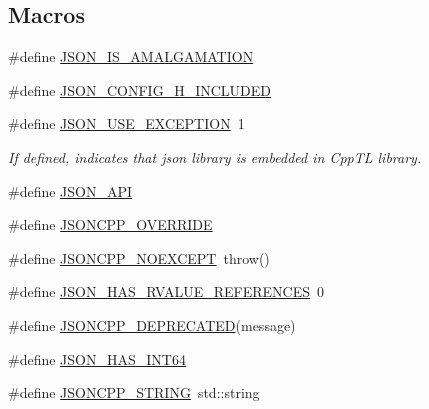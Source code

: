 \subsection*{Macros}
\begin{DoxyCompactItemize}
\item 
\#define \hyperlink{json-forwards_8h_a1bf16856b5e907aa83ed7bc825bc5ecf_a1bf16856b5e907aa83ed7bc825bc5ecf}{J\+S\+O\+N\+\_\+\+I\+S\+\_\+\+A\+M\+A\+L\+G\+A\+M\+A\+T\+I\+ON}
\item 
\#define \hyperlink{json-forwards_8h_a71f1a94bee4773f2a6e30eeac7deb963_a71f1a94bee4773f2a6e30eeac7deb963}{J\+S\+O\+N\+\_\+\+C\+O\+N\+F\+I\+G\+\_\+\+H\+\_\+\+I\+N\+C\+L\+U\+D\+ED}
\item 
\#define \hyperlink{json-forwards_8h_a51968e67b1462ac893f87a0fc8b791cd_a51968e67b1462ac893f87a0fc8b791cd}{J\+S\+O\+N\+\_\+\+U\+S\+E\+\_\+\+E\+X\+C\+E\+P\+T\+I\+ON}~1
\begin{DoxyCompactList}\small\item\em If defined, indicates that json library is embedded in Cpp\+TL library. \end{DoxyCompactList}\item 
\#define \hyperlink{json-forwards_8h_a1d61ffde86ce1a18fd83194ff0d9a206_a1d61ffde86ce1a18fd83194ff0d9a206}{J\+S\+O\+N\+\_\+\+A\+PI}
\item 
\#define \hyperlink{json-forwards_8h_a824d6199c91488107e443226fa6022c5_a824d6199c91488107e443226fa6022c5}{J\+S\+O\+N\+C\+P\+P\+\_\+\+O\+V\+E\+R\+R\+I\+DE}
\item 
\#define \hyperlink{json-forwards_8h_af8418c6d82d9de6e5f3c739fcf2fe88d_af8418c6d82d9de6e5f3c739fcf2fe88d}{J\+S\+O\+N\+C\+P\+P\+\_\+\+N\+O\+E\+X\+C\+E\+PT}~throw()
\item 
\#define \hyperlink{json-forwards_8h_a978860f0e3983ca76a4e5af28d9bccd4_a978860f0e3983ca76a4e5af28d9bccd4}{J\+S\+O\+N\+\_\+\+H\+A\+S\+\_\+\+R\+V\+A\+L\+U\+E\+\_\+\+R\+E\+F\+E\+R\+E\+N\+C\+ES}~0
\item 
\#define \hyperlink{json-forwards_8h_a6933a4321aa03c8a29016669073f1af6_a6933a4321aa03c8a29016669073f1af6}{J\+S\+O\+N\+C\+P\+P\+\_\+\+D\+E\+P\+R\+E\+C\+A\+T\+ED}(message)
\item 
\#define \hyperlink{json-forwards_8h_a210f7d060accd6a881cd070dc7a333a4_a210f7d060accd6a881cd070dc7a333a4}{J\+S\+O\+N\+\_\+\+H\+A\+S\+\_\+\+I\+N\+T64}
\item 
\#define \hyperlink{json-forwards_8h_a1e723f95759de062585bc4a8fd3fa4be_a1e723f95759de062585bc4a8fd3fa4be}{J\+S\+O\+N\+C\+P\+P\+\_\+\+S\+T\+R\+I\+NG}~std\+::string

\end{DoxyCompactItemize}

